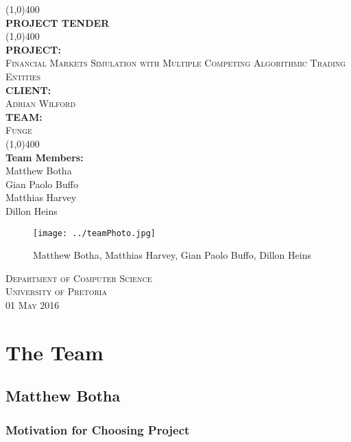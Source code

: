 \documentclass{article}
\begin{document}
\begin{titlepage}
	\begin{center}
		\line(1,0){400}\\
		[6mm]
		\huge{\bfseries PROJECT TENDER}\\
		[2mm]
		\line(1,0){400}\\
		[5mm]
		\large\textbf{PROJECT:}\\\textsc{Financial Markets Simulation with Multiple Competing Algorithmic Trading Entities}\\
		[3mm]
		\large\textbf{CLIENT:}\\\textsc{Adrian Wilford}\\
		[3mm]
		\large \textbf{TEAM:}\\\textsc{Funge}\\
		\line(1,0){400}\\
		[5mm]
		\large \textbf{Team Members:}\\
		[3mm]
		\large Matthew Botha\\
		\large Gian Paolo Buffo\\
		\large Matthias Harvey\\
        \large Dillon Heins\\[3mm]
		\begin{figure}[H]
			\centering
			\texttt{[image: ../teamPhoto.jpg]}
			\caption{Matthew Botha, Matthias Harvey, Gian Paolo Buffo, Dillon Heins}
		\end{figure}
    \end{center}

    \begin{flushright}
        \textsc{\large Department of Computer Science\\
        University of Pretoria\\
        01 May 2016\\}
    \end{flushright}
\end{titlepage}

\section{The Team}
	\subsection{Matthew Botha}
		
		\subsubsection{Motivation for Choosing Project}
		
\end{document}
